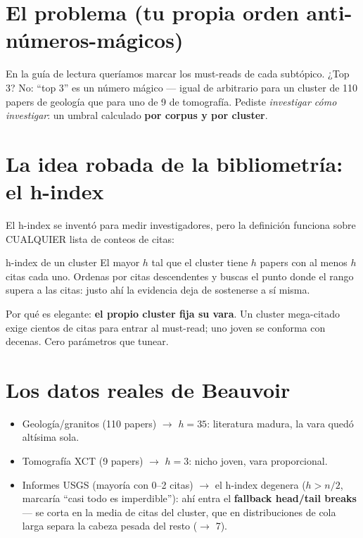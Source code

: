 \documentclass[11pt,a4paper]{article}
\begin{document}
\section{El problema (tu propia orden anti-números-mágicos)}

En la guía de lectura queríamos marcar los must-reads de cada subtópico. ¿Top 3? No:
``top 3'' es un número mágico — igual de arbitrario para un cluster de 110 papers de
geología que para uno de 9 de tomografía. Pediste \emph{investigar cómo investigar}:
un umbral calculado \textbf{por corpus y por cluster}.

\section{La idea robada de la bibliometría: el h-index}

El h-index se inventó para medir investigadores, pero la definición funciona sobre
CUALQUIER lista de conteos de citas:

\begin{concepto}{h-index de un cluster}
El mayor $h$ tal que el cluster tiene $h$ papers con al menos $h$ citas cada uno.
Ordenas por citas descendentes y buscas el punto donde el rango supera a las citas:
justo ahí la evidencia deja de sostenerse a sí misma.
\end{concepto}

Por qué es elegante: \textbf{el propio cluster fija su vara}. Un cluster mega-citado
exige cientos de citas para entrar al must-read; uno joven se conforma con decenas.
Cero parámetros que tunear.

\section{Los datos reales de Beauvoir}

\begin{itemize}
  \item Geología/granitos (110 papers) $\rightarrow$ $h = 35$: literatura madura, la
        vara quedó altísima sola.
  \item Tomografía XCT (9 papers) $\rightarrow$ $h = 3$: nicho joven, vara proporcional.
  \item Informes USGS (mayoría con 0--2 citas) $\rightarrow$ el h-index degenera
        ($h > n/2$, marcaría ``casi todo es imperdible''): ahí entra el \textbf{fallback
        head/tail breaks} — se corta en la media de citas del cluster, que en
        distribuciones de cola larga separa la cabeza pesada del resto ($\rightarrow$ 7).
\end{itemize}
\end{document}

